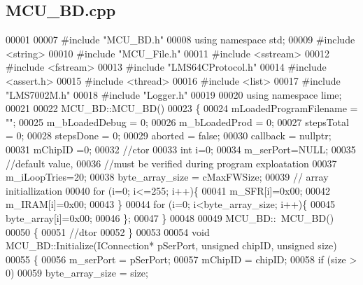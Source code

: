 \subsection{M\+C\+U\+\_\+\+B\+D.\+cpp}
\label{MCU__BD_8cpp_source}

\begin{DoxyCode}
00001 
00007 \textcolor{preprocessor}{#include "MCU_BD.h"}
00008 \textcolor{keyword}{using namespace }std;
00009 \textcolor{preprocessor}{#include <string>}
00010 \textcolor{preprocessor}{#include "MCU_File.h"}
00011 \textcolor{preprocessor}{#include <sstream>}
00012 \textcolor{preprocessor}{#include <fstream>}
00013 \textcolor{preprocessor}{#include "LMS64CProtocol.h"}
00014 \textcolor{preprocessor}{#include <assert.h>}
00015 \textcolor{preprocessor}{#include <thread>}
00016 \textcolor{preprocessor}{#include <list>}
00017 \textcolor{preprocessor}{#include "LMS7002M.h"}
00018 \textcolor{preprocessor}{#include "Logger.h"}
00019 
00020 \textcolor{keyword}{using namespace }lime;
00021 
00022 MCU\_BD::MCU\_BD()
00023 \{
00024     mLoadedProgramFilename = \textcolor{stringliteral}{""};
00025     m\_bLoadedDebug = 0;
00026     m\_bLoadedProd = 0;
00027     stepsTotal = 0;
00028     stepsDone = 0;
00029     aborted = \textcolor{keyword}{false};
00030     callback = \textcolor{keyword}{nullptr};
00031     mChipID =0;
00032     \textcolor{comment}{//ctor}
00033     \textcolor{keywordtype}{int} i=0;
00034     m\_serPort=NULL;
00035     \textcolor{comment}{//default value,}
00036     \textcolor{comment}{//must be verified during program exploatation}
00037     m\_iLoopTries=20;
00038     byte\_array\_size = cMaxFWSize;
00039     \textcolor{comment}{// array initiallization}
00040     \textcolor{keywordflow}{for} (i=0; i<=255; i++)\{
00041             m\_SFR[i]=0x00;
00042             m\_IRAM[i]=0x00;
00043     \}
00044     \textcolor{keywordflow}{for} (i=0; i<byte\_array\_size; i++)\{
00045         byte\_array[i]=0x00;
00046     \};
00047 \}
00048 
00049 MCU\_BD::~MCU\_BD()
00050 \{
00051     \textcolor{comment}{//dtor}
00052 \}
00053 
00054 \textcolor{keywordtype}{void} MCU\_BD::Initialize(IConnection* pSerPort, \textcolor{keywordtype}{unsigned} chipID, \textcolor{keywordtype}{unsigned} size)
00055 \{
00056     m\_serPort = pSerPort;
00057     mChipID = chipID;
00058     \textcolor{keywordflow}{if} (size > 0)
00059         byte\_array\_size = size;

\end{DoxyCode}
